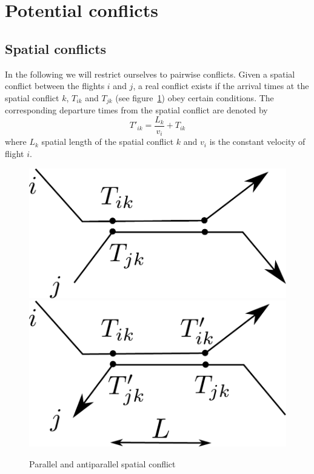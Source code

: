 \documentclass{article}
\begin{document}
\newpage
\appendix
\section{Potential conflicts}
\label{app:potential_conflicts}
\subsection{Spatial conflicts}
In the following we will restrict ourselves to pairwise conflicts.
Given a spatial conflict between the flights $i$ and $j$, a real conflict exists if the arrival times at the spatial conflict $k$, $T_{ik}$ and $T_{jk}$ (see figure~\ref{fig:spatial_conflicts}) obey certain conditions.
The corresponding departure times from the spatial conflict are denoted by 
\begin{equation*}
    T'_{ik} = \frac{L_k}{v_i} + T_{ik}
\end{equation*}
where $L_k$ spatial length of the spatial conflict $k$ and $v_i$ is the constant velocity of flight $i$.
\begin{figure}[htpb]
    \centering
    \includegraphics[width=0.3\linewidth]{pics/spatial_conflict_parallel.pdf}
    \hspace{1cm}
    \includegraphics[width=0.3\linewidth]{pics/spatial_conflict_anti_parallel.pdf}
    \caption{Parallel and antiparallel spatial conflict}
    \label{fig:spatial_conflicts}
\end{figure}
\end{document}
